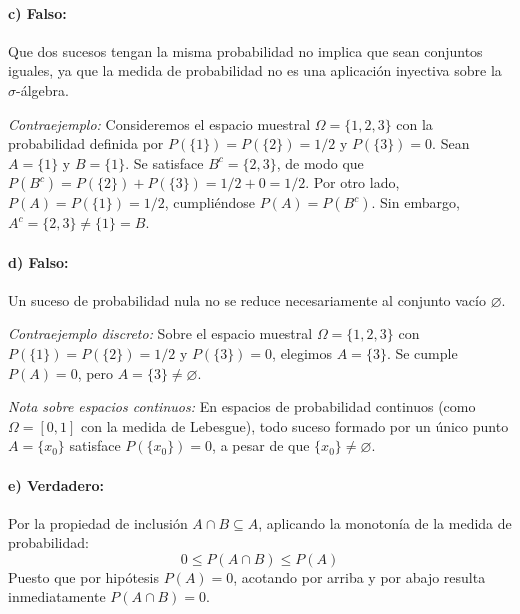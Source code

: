 \begin{problema}
\paragraph{c) Falso:}
Que dos sucesos tengan la misma probabilidad no implica que sean conjuntos iguales, ya que la medida de probabilidad no es una aplicación inyectiva sobre la $\sigma$-álgebra.

\textit{Contraejemplo:} Consideremos el espacio muestral $\Omega = \{1, 2, 3\}$ con la probabilidad definida por $P(\{1\}) = P(\{2\}) = 1/2$ y $P(\{3\}) = 0$. Sean $A = \{1\}$ y $B = \{1\}$.
Se satisface $B^c = \{2, 3\}$, de modo que $P(B^c) = P(\{2\}) + P(\{3\}) = 1/2 + 0 = 1/2$.
Por otro lado, $P(A) = P(\{1\}) = 1/2$, cumpliéndose $P(A) = P(B^c)$. Sin embargo, $A^c = \{2, 3\} \neq \{1\} = B$.

\begin{center}
    \vspace{0.2cm}
    \vspace{0.2cm}
\end{center}

\paragraph{d) Falso:}
Un suceso de probabilidad nula no se reduce necesariamente al conjunto vacío $\varnothing$.

\textit{Contraejemplo discreto:} Sobre el espacio muestral $\Omega = \{1, 2, 3\}$ con $P(\{1\}) = P(\{2\}) = 1/2$ y $P(\{3\}) = 0$, elegimos $A = \{3\}$. Se cumple $P(A) = 0$, pero $A = \{3\} \neq \varnothing$.

\textit{Nota sobre espacios continuos:} En espacios de probabilidad continuos (como $\Omega = [0,1]$ con la medida de Lebesgue), todo suceso formado por un único punto $A = \{x_0\}$ satisface $P(\{x_0\}) = 0$, a pesar de que $\{x_0\} \neq \varnothing$.

\paragraph{e) Verdadero:}
Por la propiedad de inclusión $A \cap B \subseteq A$, aplicando la monotonía de la medida de probabilidad:
\[
    0 \le P(A \cap B) \le P(A)
\]
Puesto que por hipótesis $P(A) = 0$, acotando por arriba y por abajo resulta inmediatamente $P(A \cap B) = 0$.
\end{problema}

